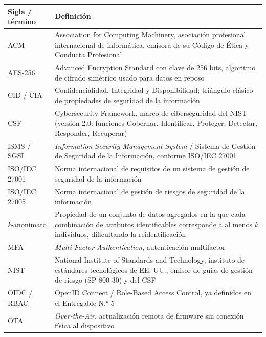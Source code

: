 \documentclass[11pt,a4paper]{article}
\begin{document}
{\small
\begin{longtable}[]{@{}
  >{\raggedright\arraybackslash}p{}
  >{\raggedright\arraybackslash}p{}@{}}
\toprule\noalign{}
\begin{minipage}[b]{\linewidth}\raggedright
Sigla / término
\end{minipage} & \begin{minipage}[b]{\linewidth}\raggedright
Definición
\end{minipage} \\
\midrule\noalign{}
\endhead
\bottomrule\noalign{}
\endlastfoot
ACM & Association for Computing Machinery, asociación profesional internacional de informática, emisora de su Código de Ética y Conducta Profesional \\
AES-256 & Advanced Encryption Standard con clave de 256 bits, algoritmo de cifrado simétrico usado para datos en reposo \\
CID / CIA & Confidencialidad, Integridad y Disponibilidad; triángulo clásico de propiedades de seguridad de la información \\
CSF & Cybersecurity Framework, marco de ciberseguridad del NIST (versión 2.0: funciones Gobernar, Identificar, Proteger, Detectar, Responder, Recuperar) \\
ISMS / SGSI & \emph{Information Security Management System} / Sistema de Gestión de Seguridad de la Información, conforme ISO/IEC 27001 \\
ISO/IEC 27001 & Norma internacional de requisitos de un sistema de gestión de seguridad de la información \\
ISO/IEC 27005 & Norma internacional de gestión de riesgos de seguridad de la información \\
\emph{k}-anonimato & Propiedad de un conjunto de datos agregados en la que cada combinación de atributos identificables corresponde a al menos \emph{k} individuos, dificultando la reidentificación \\
MFA & \emph{Multi-Factor Authentication}, autenticación multifactor \\
NIST & National Institute of Standards and Technology, instituto de estándares tecnológicos de EE. UU., emisor de guías de gestión de riesgo (SP 800-30) y del CSF \\
OIDC / RBAC & OpenID Connect / Role-Based Access Control, ya definidos en el Entregable N.° 5 \\
OTA & \emph{Over-the-Air}, actualización remota de firmware sin conexión física al dispositivo \\

\end{longtable}}
\end{document}
